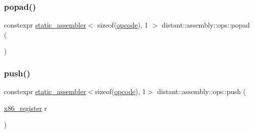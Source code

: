 \mbox{\label{namespacedistant_1_1assembly_1_1ops_a619e006765dfa164e86e5ea40160972c}} 
\subsubsection{\texorpdfstring{popad()}{popad()}}
{\footnotesize\ttfamily constexpr \mbox{\hyperlink{classdistant_1_1assembly_1_1static__assembler}{static\+\_\+assembler}}$<$ sizeof(\mbox{\hyperlink{namespacedistant_1_1assembly_a64d7b047d9e3df1ac04919f7c4f8f6fa}{opcode}}), 1 $>$ distant\+::assembly\+::ops\+::popad (\begin{DoxyParamCaption}{ }\end{DoxyParamCaption})\hspace{0.3cm}{\ttfamily [noexcept]}}

\mbox{\label{namespacedistant_1_1assembly_1_1ops_a32cc52491da0e2a291e595b409fd94fd}} 
\subsubsection{\texorpdfstring{push()}{push()}\hspace{0.1cm}{\footnotesize\ttfamily [1/2]}}
{\footnotesize\ttfamily constexpr \mbox{\hyperlink{classdistant_1_1assembly_1_1static__assembler}{static\+\_\+assembler}}$<$sizeof(\mbox{\hyperlink{namespacedistant_1_1assembly_a64d7b047d9e3df1ac04919f7c4f8f6fa}{opcode}}), 1$>$ distant\+::assembly\+::ops\+::push (\begin{DoxyParamCaption}\item[{\mbox{\hyperlink{namespacedistant_1_1assembly_a873d3faa0111fc5605de36beaaaafb3e}{x86\+\_\+register}}}]{r }\end{DoxyParamCaption})\hspace{0.3cm}{\ttfamily [noexcept]}}

\mbox{\label{namespacedistant_1_1assembly_1_1ops_a08c86c7af31151c5c8b26269ba640c11}} 
